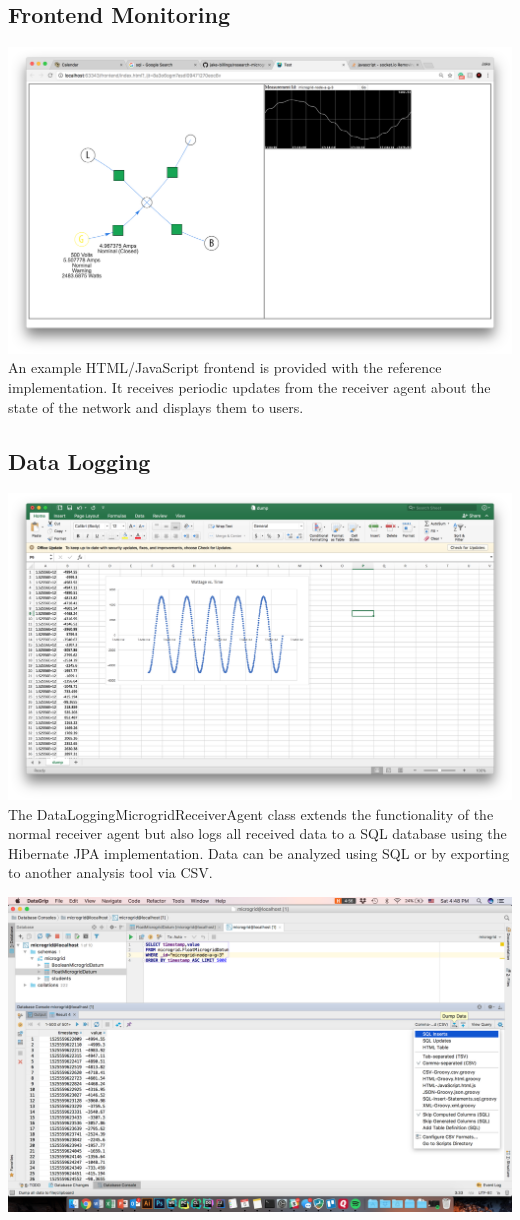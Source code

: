 \documentclass{article}
\begin{document}
\subsection{Frontend Monitoring}
\includegraphics[width=\textwidth]{screenshots/screenshotRealtimeGraph.png}
An example HTML/JavaScript frontend is provided with the reference implementation. It receives periodic updates from the receiver agent about the state of the network and displays them to users.

\subsection{Data Logging}
\includegraphics[width=\textwidth]{screenshots/screenshotSQLExcel.png}
The DataLoggingMicrogridReceiverAgent class extends the functionality of the normal receiver agent but also logs all received data to a SQL database using the Hibernate JPA implementation. Data can be analyzed using SQL or by exporting to another analysis tool via CSV.


\includegraphics[width=\textwidth]{screenshots/screenshotSQLDatagrip5.png}
\end{document}

